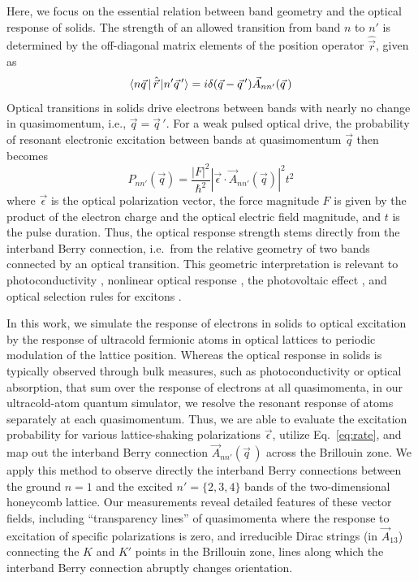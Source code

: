 \documentclass[superscriptaddress, reprint, amsmath, amssymb, aps, prl]{revtex4-2}
\begin{document}
Here, we focus on the essential relation between band geometry  and the optical response of solids.  The strength of an allowed transition from band $n$ to $n'$ is determined by the off-diagonal matrix elements of the position operator $\hat{\vec{r}}$, given as \cite{blou62,rest94rmp}
\begin{equation}
    \bra{n \vec{q}\,} \hat{\vec{r}} \ket{n' \vec{q}\,'}  = i \delta(\vec{q}-\vec{q}\,') \vec{A}_{n n'}(\vec{q}\,)
\end{equation}
Optical transitions in solids drive electrons between bands with nearly no change in quasimomentum, i.e., $\vec{q} = \vec{q}\,'$.  For a weak pulsed optical drive, the probability of resonant electronic excitation between bands at quasimomentum $\vec{q}$ then becomes
\begin{equation}
    P_{n n'}(\vec{q}) = \frac{|F|^2}{\hbar^2} |\vec{\epsilon} \cdot \vec{A}_{n n'}(\vec{q})|^2 t^2
    \label{eq:rate}
\end{equation}
where $\vec{\epsilon}$ is the optical polarization vector, the force magnitude $F$ is given by the product of the electron charge and the optical electric field magnitude, and $t$ is the pulse duration. Thus, the optical response strength stems directly from the interband Berry connection, i.e.\ from the relative geometry of two bands connected by an optical transition.  This geometric interpretation is relevant to photoconductivity \cite{jankowski_optical_2025, onishi_fundamental_2024},
nonlinear optical response \cite{hughes_calculation_1996, morimoto_topological_2016}, the photovoltaic effect \cite{dai_recent_2023, de_juan_quantized_2017}, and optical selection rules for excitons \cite{cao_unifying_2018}. 

In this work, we simulate the response of electrons in solids to optical excitation by the response of ultracold fermionic atoms in optical lattices to periodic modulation of the lattice position. Whereas the optical response in solids is typically observed through bulk measures, such as photoconductivity or optical absorption, that sum over the response of electrons at all quasimomenta, in our ultracold-atom quantum simulator, we resolve the resonant response of atoms separately at each quasimomentum.  Thus, we are able to evaluate the excitation probability for various lattice-shaking polarizations $\vec{\epsilon}$, utilize Eq.~\ref{eq:rate}, and map out the interband Berry connection $\vec{A}_{n n'}(\vec{q}\,)$ across the Brillouin zone. We apply this method to observe directly the interband Berry connections between the ground $n=1$ and the excited $n' = \{2,3,4\}$ bands of the two-dimensional honeycomb lattice. Our measurements reveal detailed features of these vector fields, including ``transparency lines'' of quasimomenta where the response to excitation of specific polarizations is zero, and irreducible Dirac strings (in $\vec{A}_{13}$) connecting the $K$ and $K'$ points in the Brillouin zone, lines along which the interband Berry connection abruptly changes orientation.
\end{document}
